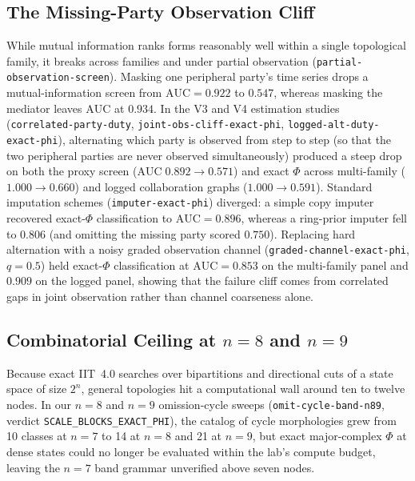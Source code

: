 \documentclass[11pt,a4paper]{article}
\begin{document}
\subsection{The Missing-Party Observation Cliff}

While mutual information ranks forms reasonably well within a single topological family, it breaks across families and under partial observation (\texttt{partial-observation-screen}). Masking one peripheral party's time series drops a mutual-information screen from $\mathrm{AUC} = 0.922$ to $0.547$, whereas masking the mediator leaves $\mathrm{AUC}$ at $0.934$. In the V3 and V4 estimation studies (\texttt{correlated-party-duty}, \texttt{joint-obs-cliff-exact-phi}, \texttt{logged-alt-duty-exact-phi}), alternating which party is observed from step to step (so that the two peripheral parties are never observed simultaneously) produced a steep drop on both the proxy screen ($\mathrm{AUC}\;0.892 \to 0.571$) and exact $\Phi$ across multi-family ($1.000 \to 0.660$) and logged collaboration graphs ($1.000 \to 0.591$). Standard imputation schemes (\texttt{imputer-exact-phi}) diverged: a simple copy imputer recovered exact-$\Phi$ classification to $\mathrm{AUC} = 0.896$, whereas a ring-prior imputer fell to $0.806$ (and omitting the missing party scored $0.750$). Replacing hard alternation with a noisy graded observation channel (\texttt{graded-channel-exact-phi}, $q = 0.5$) held exact-$\Phi$ classification at $\mathrm{AUC} = 0.853$ on the multi-family panel and $0.909$ on the logged panel, showing that the failure cliff comes from correlated gaps in joint observation rather than channel coarseness alone.

\subsection{Combinatorial Ceiling at \texorpdfstring{$n = 8$ and $n = 9$}{n = 8 and n = 9}}

Because exact IIT~4.0 searches over bipartitions and directional cuts of a state space of size $2^n$, general topologies hit a computational wall around ten to twelve nodes. In our $n = 8$ and $n = 9$ omission-cycle sweeps (\texttt{omit-cycle-band-n89}, verdict \texttt{SCALE\_BLOCKS\_EXACT\_PHI}), the catalog of cycle morphologies grew from 10 classes at $n = 7$ to 14 at $n = 8$ and 21 at $n = 9$, but exact major-complex $\Phi$ at dense states could no longer be evaluated within the lab's compute budget, leaving the $n = 7$ band grammar unverified above seven nodes.
\end{document}
